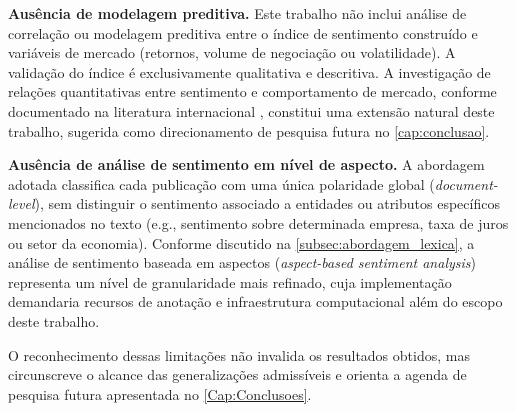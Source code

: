\textbf{Ausência de modelagem preditiva.} Este trabalho não inclui análise de correlação ou modelagem preditiva entre o índice de sentimento construído e variáveis de mercado (retornos, volume
de negociação ou volatilidade). A validação do índice é exclusivamente qualitativa e descritiva. A investigação de relações quantitativas entre sentimento e comportamento de mercado, conforme documentado na literatura internacional \cite{tetlock2007,bollen2011,ranco2015}, constitui uma extensão natural deste trabalho, sugerida como direcionamento de pesquisa futura no \autoref{cap:conclusao}.

\textbf{Ausência de análise de sentimento em nível de aspecto.} A abordagem adotada classifica cada publicação com uma única polaridade global (\textit{document-level}), sem distinguir o sentimento associado a entidades ou atributos específicos mencionados no texto (e.g., sentimento sobre determinada empresa, taxa de juros ou setor da economia). Conforme discutido na \autoref{subsec:abordagem_lexica}, a análise de sentimento baseada em aspectos (\textit{aspect-based sentiment analysis}) representa um nível de granularidade mais refinado, cuja implementação
demandaria recursos de anotação e infraestrutura computacional além do escopo deste trabalho.

O reconhecimento dessas limitações não invalida os resultados obtidos, mas circunscreve o alcance das generalizações admissíveis e orienta a agenda de pesquisa futura apresentada no \autoref{Cap:Conclusoes}.
